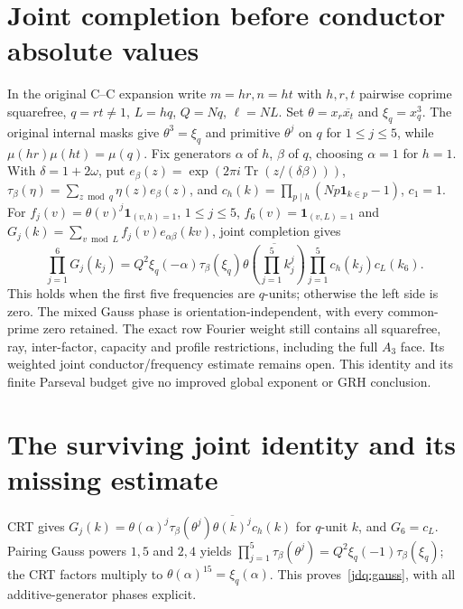\documentclass[11pt]{article}
\theoremstyle{definition}\newtheorem{definition}[theorem]{Definition}
\theoremstyle{remark}\newtheorem{remark}[theorem]{Remark}
\begin{document}
\section{Joint completion before conductor absolute values}\label{jdq:core}
In the original C--C expansion write $m=hr,n=ht$ with $h,r,t$
pairwise coprime squarefree, $q=rt\ne1$, $L=hq$, $Q=Nq$, $\ell=NL$.
Set $\theta=x_r\overline{x_t}$ and $\xi_q=x_q^3$.
The original internal masks give $\theta^3=\xi_q$ and primitive
$\theta^j$ on $q$ for $1\le j\le5$, while
$\mu(hr)\mu(ht)=\mu(q)$. Fix generators $\alpha$ of $h$, $\beta$ of
$q$, choosing $\alpha=1$ for $h=1$. With $\delta=1+2\omega$, put
$e_\beta(z)=\exp(2\pi i\operatorname{Tr}(z/(\delta\beta)))$,
$\tau_\beta(\eta)=\sum_{z\bmod q}\eta(z)e_\beta(z)$, and
$c_h(k)=\prod_{p\mid h}(Np\mathbf1_{k\in p}-1)$, $c_1=1$.
For $f_j(v)=\theta(v)^j\mathbf1_{(v,h)=1}$, $1\le j\le5$,
$f_6(v)=\mathbf1_{(v,L)=1}$ and
$G_j(k)=\sum_{v\bmod L}f_j(v)e_{\alpha\beta}(kv)$, joint completion gives
\begin{equation}\label{jdq:gauss}
 \prod_{j=1}^6G_j(k_j)=Q^2\xi_q(-\alpha)\tau_\beta(\xi_q)
 \overline{\theta(\prod_{j=1}^5k_j^j)}
 \prod_{j=1}^5c_h(k_j)c_L(k_6).
\end{equation}
This holds when the first five frequencies are $q$-units; otherwise
the left side is zero. The mixed Gauss phase is orientation-independent,
with every common-prime zero retained. The exact row Fourier weight
still contains all squarefree, ray, inter-factor, capacity and profile
restrictions, including the full $A_3$ face. Its weighted joint
conductor/frequency estimate remains open. This identity and its finite
Parseval budget give no improved global exponent or GRH conclusion.

\section{The surviving joint identity and its missing estimate}\label{jdq:details}
CRT gives $G_j(k)=\theta(\alpha)^j\tau_\beta(\theta^j)
\overline{\theta(k)^j}c_h(k)$ for $q$-unit $k$, and $G_6=c_L$.
Pairing Gauss powers $1,5$ and $2,4$ yields
$\prod_{j=1}^5\tau_\beta(\theta^j)=Q^2\xi_q(-1)\tau_\beta(\xi_q)$;
the CRT factors multiply to $\theta(\alpha)^{15}=\xi_q(\alpha)$.
This proves~\eqref{jdq:gauss}, with all additive-generator phases explicit.
\end{document}
